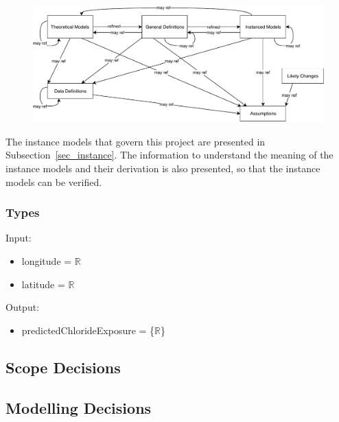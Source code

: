\documentclass[12pt]{article}
\begin{document}
\noindent {}

\begin{figure}[H]
  \includegraphics[scale=0.9]{RelationsBetweenTM_GD_IM_DD_A.pdf}
\end{figure}

The instance models that govern this project are presented in
Subsection~\ref{sec_instance}.  The information to understand the meaning of the
instance models and their derivation is also presented, so that the instance
models can be verified.

\subsubsection{Types}


Input:
\begin{itemize}
\item longitude = $\mathbb{R}$
\item latitude = $\mathbb{R}$

\end{itemize}
Output:
\begin{itemize}
\item predictedChlorideExposure = \{$\mathbb{R}$\}
\end{itemize}

\subsection{Scope Decisions}

\subsection{Modelling Decisions}
\end{document}
